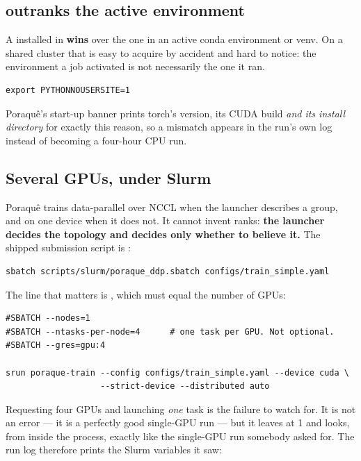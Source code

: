 \subsection{ outranks the active environment}

A  installed in 
\textbf{wins} over the one in an active conda environment or venv. On a shared
cluster that is easy to acquire by accident and hard to notice: the environment
a job activated is not necessarily the one it ran.

\begin{lstlisting}
export PYTHONNOUSERSITE=1
\end{lstlisting}

Poraqu\^e's start-up banner prints torch's version, its CUDA build \emph{and its
install directory} for exactly this reason, so a mismatch appears in the run's
own log instead of becoming a four-hour CPU run.

\subsection{Several GPUs, under Slurm}
\label{sec:multigpu}

Poraqu\^e trains data-parallel over NCCL when the launcher describes a group,
and on one device when it does not. It cannot invent ranks: \textbf{the
launcher decides the topology and  decides only
whether to believe it.} The shipped submission script is
:

\begin{lstlisting}
sbatch scripts/slurm/poraque_ddp.sbatch configs/train_simple.yaml
\end{lstlisting}

The line that matters is , which must equal the number
of GPUs:

\begin{lstlisting}
#SBATCH --nodes=1
#SBATCH --ntasks-per-node=4      # one task per GPU. Not optional.
#SBATCH --gres=gpu:4

srun poraque-train --config configs/train_simple.yaml --device cuda \
                   --strict-device --distributed auto
\end{lstlisting}

Requesting four GPUs and launching \emph{one} task is the failure to watch
for. It is not an error --- it is a perfectly good single-GPU run --- but it
leaves \opt{SLURM\_NTASKS} at 1 and looks, from inside the process, exactly
like the single-GPU run somebody asked for. The run log therefore prints the
Slurm variables it saw:

